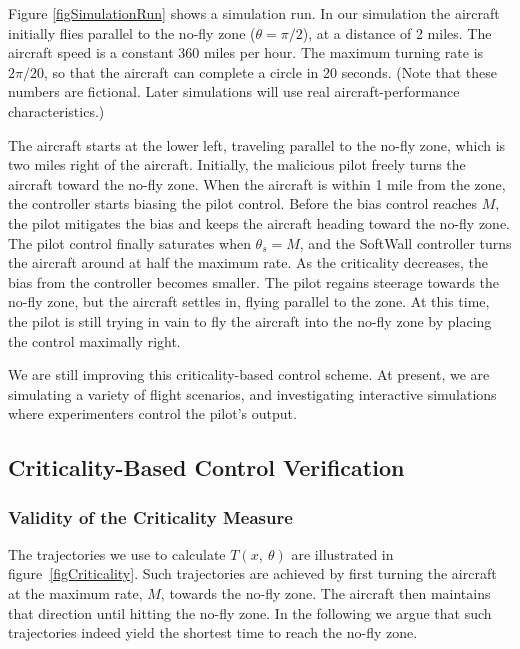 \documentclass[11pt]{article}
\begin{document}
Figure \ref{figSimulationRun} shows a simulation run.  In our
simulation the aircraft initially flies parallel to the no-fly zone
($\theta = \pi / 2$), at a distance of 2 miles. The aircraft speed is
a constant 360 miles per hour. The maximum turning rate is $2\pi/20$,
so that the aircraft can complete a circle in 20 seconds. (Note that
these numbers are fictional. Later simulations will use real
aircraft-performance characteristics.)

The aircraft starts at the lower left, traveling parallel to the
no-fly zone, which is two miles right of the aircraft.  Initially, the
malicious pilot freely turns the aircraft toward the no-fly zone. When
the aircraft is within 1 mile from the zone, the controller starts
biasing the pilot control. Before the bias control reaches $M$, the
pilot mitigates the bias and keeps the aircraft heading toward the
no-fly zone.  The pilot control finally saturates when $\theta_{s} =
M$, and the SoftWall controller turns the aircraft around at half the
maximum rate. As the criticality decreases, the bias from the
controller becomes smaller. The pilot regains steerage towards the
no-fly zone, but the aircraft settles in, flying parallel to the
zone. At this time, the pilot is still trying in vain to fly the
aircraft into the no-fly zone by placing the control maximally right.

We are still improving this criticality-based control scheme. At
present, we are simulating a variety of flight scenarios, and
investigating interactive simulations where experimenters control the
pilot's output.


\subsection{Criticality-Based Control Verification}

\subsubsection{Validity of the Criticality Measure}

The trajectories we use to calculate $T(x,\ \theta)$ are illustrated
in figure~\ref{figCriticality}. Such trajectories are achieved by
first turning the aircraft at the maximum rate, $M$, towards the
no-fly zone.  The aircraft then maintains that direction until hitting
the no-fly zone. In the following we argue that such trajectories
indeed yield the shortest time to reach the no-fly zone.
\end{document}
